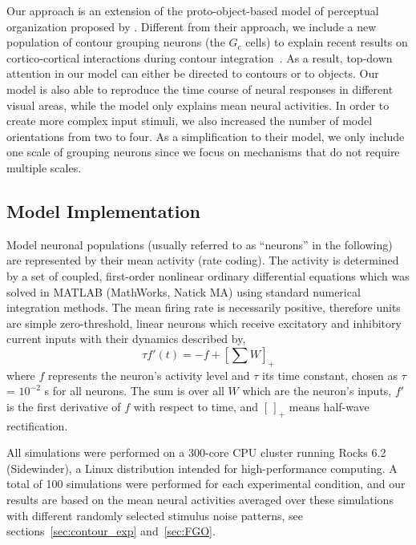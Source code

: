 Our approach is an extension of the proto-object-based model of
perceptual organization proposed by \cite{Mihalas_etal11b}. Different
from their approach, we include a new population of contour grouping
neurons (the $G_c$ cells) to explain recent results on cortico-cortical interactions
during contour integration~\citep{Chen_etal14}. As a result, top-down
attention in our model can either be directed to 
contours or to objects. Our model is also able to reproduce
the time course of neural responses in different visual areas, while
the \cite{Mihalas_etal11b} model only explains mean neural
activities. In order to create more complex input stimuli, we also
increased the number of model orientations from two to four. As a
simplification to their model, we only include one scale of grouping
neurons since we focus on mechanisms that do not require multiple
scales.

\subsection{Model Implementation}
\label{sec:implementation}
Model neuronal populations (usually referred to as ``neurons'' in the
following) are represented by their mean activity (rate coding).  The
activity is determined by a set of coupled, first-order nonlinear
ordinary differential equations which was solved in MATLAB (MathWorks,
Natick MA) using standard numerical integration methods.  The mean
firing rate is necessarily positive, therefore units are simple
zero-threshold, linear neurons which receive excitatory and inhibitory
current inputs with their dynamics described by,
\begin{equation}
\label{eq:1}
\tau f'(t) = -f + \left[ \sum W \right]_{+}
\end{equation}
where $f$ represents the neuron's activity level and $\tau$ its time
constant, chosen as $\tau$ = $10^{-2}$ s for all neurons. The sum is
over all $W$ which are the neuron's inputs,
$f'$ is the first derivative of $f$ with respect to
time, and $[\,]_{+}$ means half-wave rectification.

All simulations were performed on a 300-core CPU cluster running Rocks
6.2 (Sidewinder), a Linux distribution intended for high-performance
computing.  A total of 100 simulations were performed for each
experimental condition, and our results are based on the mean neural
activities averaged over these simulations with different randomly
selected stimulus noise patterns, see sections~\ref{sec:contour_exp}
and~\ref{sec:FGO}.

